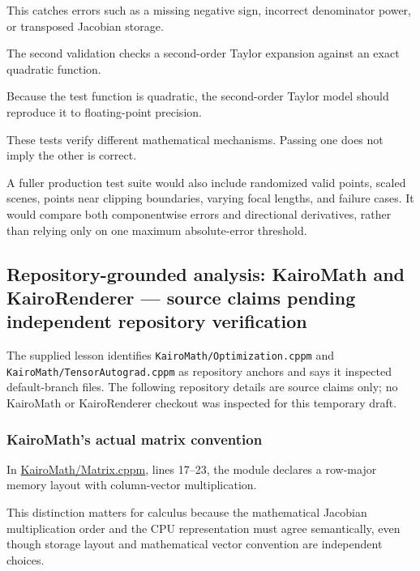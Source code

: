 This catches errors such as a missing negative sign, incorrect denominator power, or transposed Jacobian storage.

The second validation checks a second-order Taylor expansion against an exact quadratic function.

Because the test function is quadratic, the second-order Taylor model should reproduce it to floating-point precision.

These tests verify different mathematical mechanisms. Passing one does not imply the other is correct.

A fuller production test suite would also include randomized valid points, scaled scenes, points near clipping boundaries, varying focal lengths, and failure cases. It would compare both componentwise errors and directional derivatives, rather than relying only on one maximum absolute-error threshold.

\subsection{Repository-grounded analysis: KairoMath and KairoRenderer --- source claims pending independent repository verification}\label{02-foundations-ii-ch021-repository-grounded-analysis-kairomath-and-kairorenderer-source-claims-pending-independent-repository-verification}

The supplied lesson identifies \texttt{KairoMath/Optimization.cppm} and \texttt{KairoMath/TensorAutograd.cppm} as repository anchors and says it inspected default-branch files. The following repository details are source claims only; no KairoMath or KairoRenderer checkout was inspected for this temporary draft.

\subsubsection{KairoMath's actual matrix convention}\label{02-foundations-ii-ch021-kairomaths-actual-matrix-convention}

In \href{https://github.com/swayam8624/KairoMath/blob/master/Matrix.cppm?utm_source=chatgpt.com}{KairoMath/Matrix.cppm}, lines 17--23, the module declares a row-major memory layout with column-vector multiplication.

This distinction matters for calculus because the mathematical Jacobian multiplication order and the CPU representation must agree semantically, even though storage layout and mathematical vector convention are independent choices.

